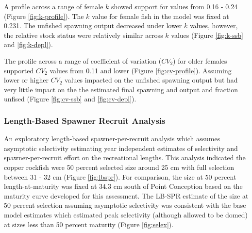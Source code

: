 \documentclass[11pt,
  english,
  a4paper,
]{article}
\begin{document}
\leavevmode\tagmcend\tagstructend\par


A profile across a range of female {\(k\)\leavevmode\tagmcend\tagstructend} showed support for values from 0.16 - 0.24 (Figure \ref{fig:k-profile}). The {\(k\)\leavevmode\tagmcend\tagstructend} value for female fish in the model was fixed at 0.231. The unfished spawning output decreased under lower {\(k\)\leavevmode\tagmcend\tagstructend} values, however, the relative stock status were relatively similar across {\(k\)\leavevmode\tagmcend\tagstructend} values (Figure \ref{fig:k-ssb} and \ref{fig:k-depl}).

\leavevmode\tagmcend\tagstructend\par


The profile across a range of coefficient of variation ({\(CV_2\)\leavevmode\tagmcend\tagstructend}) for older females supported {\(CV_2\)\leavevmode\tagmcend\tagstructend} values from 0.11 and lower (Figure \ref{fig:cv-profile}). Assuming lower or higher {\(CV_2\)\leavevmode\tagmcend\tagstructend} values impacted on the unfished spawning output but had very little impact on the the estimated final spawning and output and fraction unfised (Figure \ref{fig:cv-ssb} and \ref{fig:cv-depl}).

\leavevmode\tagmcend\tagstructend\par


\hypertarget{length-based-spawner-recruit-analysis}{%
\subsubsection{Length-Based Spawner Recruit Analysis}\label{length-based-spawner-recruit-analysis}}

\leavevmode\tagmcend\tagstructend


An exploratory length-based spawner-per-recruit analysis which assumes asymptotic selectivity estimating year independent estimates of selectivity and spawner-per-recruit effort on the recreational lengths. This analysis indicated the copper rockfish were 50 percent selected size around 25 cm with full selection between 31 - 32 cm (Figure \ref{fig:lbspr}). For comparison, the size at 50 percent length-at-maturity was fixed at 34.3 cm south of Point Conception based on the maturity curve developed for this assessment. The LB-SPR estimate of the size at 50 percent selection assuming asymptotic selectivity was consistent with the base model estimates which estimated peak selectivity (although allowed to be domed) at sizes less than 50 percent maturity (Figure \ref{fig:selex}).
\end{document}
